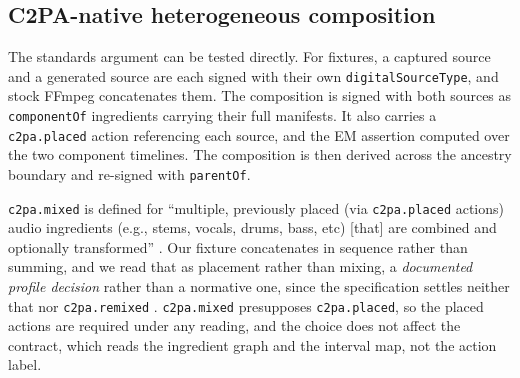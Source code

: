 \documentclass[preprint,3p,11pt,authoryear]{elsarticle}
\begin{document}
\begin{table}[t]
\centering
\caption{Kernel-support containment. Probed as Figure~\ref{fig:containment}
describes. The measured reach is the furthest any influence extended
beyond the nominal, footprint-free source range, so containment compares two
concrete quantities rather than resting on an assertion: it holds exactly when
the reach does not exceed the declaration. Headroom is the difference, so a
small headroom means a tight declaration and a large one a conservative one.
$^{\dagger}$~Probed with a fixed gain: the content footprint of a sample-wise
scaling. Estimating the gain from the input adds a whole-asset control
dependency, measured in Section~\ref{sec:res-holdout}.}
\label{tab:containment}
\small

\end{table}

\subsection{C2PA-native heterogeneous composition}
\label{sec:res-composition}

The standards argument can be tested directly. For \Jfixtures{}
fixtures, a captured source and a generated source are each signed with their
own \texttt{digitalSourceType}, and stock FFmpeg concatenates them. The
composition is signed with both sources as \texttt{componentOf} ingredients
carrying their full manifests. It also carries a \texttt{c2pa.placed} action referencing each source,
and the EM assertion computed over the two component timelines. The composition is then
derived across the ancestry boundary and re-signed with \texttt{parentOf}.

\texttt{c2pa.mixed} is defined for
``multiple, previously placed (via \texttt{c2pa.placed} actions) audio
ingredients (e.g., stems, vocals, drums, bass, etc) [that] are combined and
optionally transformed'' \citep[Table~8]{c2pa24}. Our fixture concatenates in sequence rather than summing, and we read that as
placement rather than mixing, a \emph{documented profile decision} rather than
a normative one, since the specification settles neither that nor
\texttt{c2pa.remixed} \citep[Table~8]{c2pa24}. \texttt{c2pa.mixed}
presupposes \texttt{c2pa.placed}, so the placed actions are required under any
reading, and the choice does not affect the contract, which reads the
ingredient graph and the interval map, not the action label.
\end{document}
